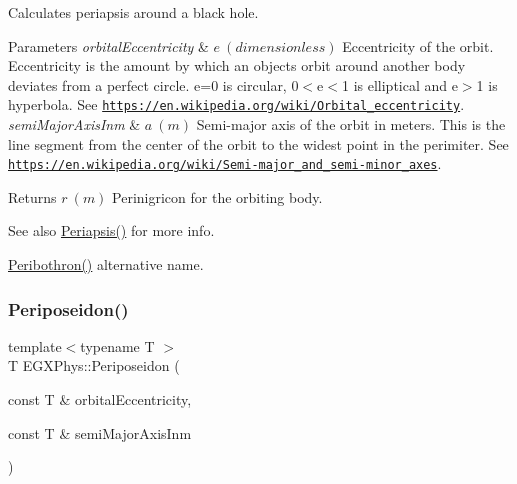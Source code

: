 Calculates periapsis around a black hole. 


\begin{DoxyParams}{Parameters}
{\em orbital\+Eccentricity} & $ e\ (dimensionless)$ Eccentricity of the orbit. Eccentricity is the amount by which an objects orbit around another body deviates from a perfect circle. e=0 is circular, 0$<$e$<$1 is elliptical and e$>$1 is hyperbola. See \href{https://en.wikipedia.org/wiki/Orbital_eccentricity}{\tt https\+://en.\+wikipedia.\+org/wiki/\+Orbital\+\_\+eccentricity}. \\
\hline
{\em semi\+Major\+Axis\+Inm} & $ a\ (m)$ Semi-\/major axis of the orbit in meters. This is the line segment from the center of the orbit to the widest point in the perimiter. See \href{https://en.wikipedia.org/wiki/Semi-major_and_semi-minor_axes}{\tt https\+://en.\+wikipedia.\+org/wiki/\+Semi-\/major\+\_\+and\+\_\+semi-\/minor\+\_\+axes}. \\
\hline
\end{DoxyParams}
\begin{DoxyReturn}{Returns}
$ r\ (m)$ Perinigricon for the orbiting body. 
\end{DoxyReturn}
\begin{DoxySeeAlso}{See also}
\mbox{\hyperlink{group___e_g_x_phys-_periapsis_gad487212733711bc2ce73c8137c9309c3}{Periapsis()}} for more info. 

\mbox{\hyperlink{group___e_g_x_phys-_periapsis_gad43bb3a6be82521d41d7a55453dec47e}{Peribothron()}} alternative name. 
\end{DoxySeeAlso}
\mbox{\label{group___e_g_x_phys-_periapsis_ga6f36f302670235e04ff91169dde59dbf}} 
\subsubsection{\texorpdfstring{Periposeidon()}{Periposeidon()}}
{\footnotesize\ttfamily template$<$typename T $>$ \\
T E\+G\+X\+Phys\+::\+Periposeidon (\begin{DoxyParamCaption}\item[{const T \&}]{orbital\+Eccentricity,  }\item[{const T \&}]{semi\+Major\+Axis\+Inm }\end{DoxyParamCaption})}



